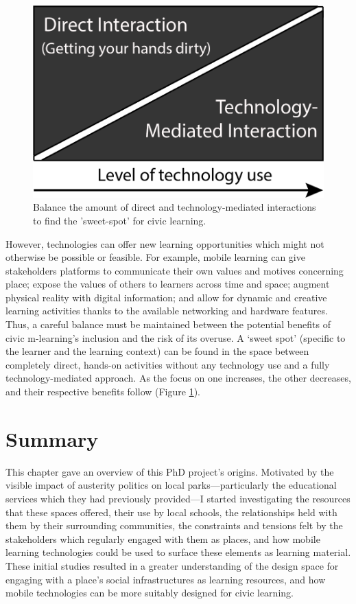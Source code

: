\begin{figure}
  \centering
  \includegraphics[width=0.45\columnwidth]{images/chapter04/techBalance.png}
  \caption[Balancing technology use]{Balance the amount of direct and technology-mediated interactions to find the 'sweet-spot' for civic learning.}
  \label{fig:techBalance}
\end{figure}

However, technologies can offer new learning opportunities which might not otherwise be possible or feasible. For example, mobile learning can give stakeholders platforms to communicate their own values and motives concerning place; expose the values of others to learners across time and space; augment physical reality with digital information; and allow for dynamic and creative learning activities thanks to the available networking and hardware features. Thus, a careful balance must be maintained between the potential benefits of civic m-learning’s inclusion and the risk of its overuse. A `sweet spot' (specific to the learner and the learning context) can be found in the space between completely direct, hands-on activities without any technology use and a fully technology-mediated approach. As the focus on one increases, the other decreases, and their respective benefits follow (Figure \ref{fig:techBalance}). 

\section{Summary}

This chapter gave an overview of this PhD project's origins. Motivated by the visible impact of austerity politics on local parks---particularly the educational services which they had previously provided---I started investigating the resources that these spaces offered, their use by local schools, the relationships held with them by their surrounding communities, the constraints and tensions felt by the stakeholders which regularly engaged with them as places, and how mobile learning technologies could be used to surface these elements as learning material. These initial studies resulted in a greater understanding of the design space for engaging with a place's social infrastructures as learning resources, and how mobile technologies can be more suitably designed for civic learning.

